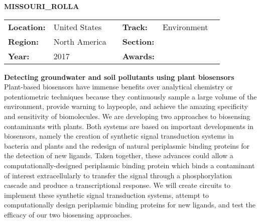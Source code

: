 \textbf{\uppercase{Missouri\_Rolla}}
\FloatBarrier
\begin{table}[h]
\begin{tabular}{lp{2.5cm}llll}
\textbf{Location:} & United States & \multicolumn{1}{|l}{} & \textbf{Track:}   & Environment \\
\textbf{Region:}   & North America   & \multicolumn{1}{|l}{} & \textbf{Section:} &  \\
\textbf{Year:}     & 2017   & \multicolumn{1}{|l}{} & \textbf{Awards:}  &
\end{tabular}
\end{table}
\FloatBarrier
\noindent	\textbf{Detecting groundwater and soil pollutants using plant biosensors} \vspace{.2cm}\\
Plant-based biosensors have immense benefits over analytical chemistry or potentiometric techniques because they continuously sample a large volume of the environment, provide warning to laypeople, and achieve the amazing specificity and sensitivity of biomolecules. 
We are developing two approaches to biosensing contaminants with plants. Both systems are based on important developments in biosensors, namely the creation of synthetic signal transduction systems in bacteria and plants and the redesign of natural periplasmic binding proteins for the detection of new ligands. Taken together, these advances could allow a computationally-designed periplasmic binding protein which binds a contaminant of interest extracellularly to transfer the signal through a phosphorylation cascade and produce a transcriptional response. We will create circuits to implement these synthetic signal transduction systems, attempt to computationally design periplasmic binding proteins for new ligands, and test the efficacy of our two biosensing approaches.
\vspace{2cm}


